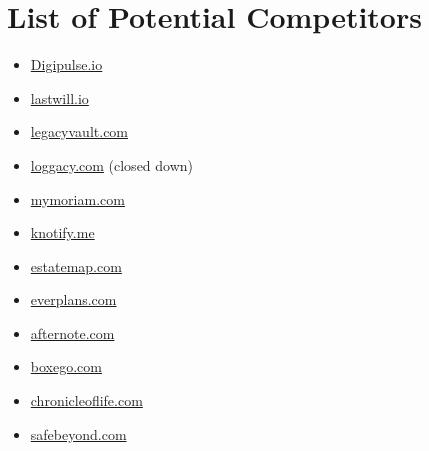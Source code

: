 \appendix

\chapter{List of Potential Competitors} %
\label{cha:list_of_potential_competitors}

\begin{itemize}
	\item \url{Digipulse.io}
	\item \url{lastwill.io}
	\item \url{legacyvault.com}
	\item \url{loggacy.com} (closed down)
	\item \url{mymoriam.com}
	\item \url{knotify.me}
	\item \url{estatemap.com}
	\item \url{everplans.com}
	\item \url{afternote.com}
	\item \url{boxego.com}
	\item \url{chronicleoflife.com}
	\item \url{safebeyond.com}
\end{itemize}

